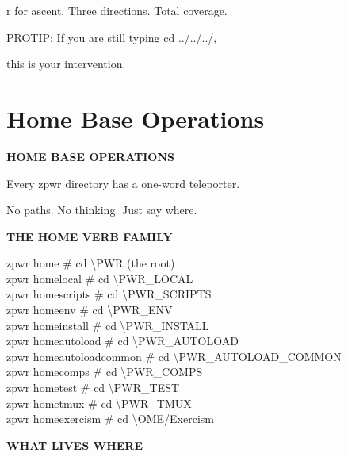 \documentclass[11pt,a4paper,twoside]{book}
\begin{document}
r for ascent. Three directions. Total coverage.

PROTIP: If you are still typing cd ../../../,

this is your intervention.


\vspace{16pt}

\section{Home Base Operations}


\vspace{10pt}
{\large\bfseries\color{neoncyan} HOME BASE OPERATIONS}\vspace{6pt}

\begin{codebox}
Every zpwr directory has a one-word teleporter.\\
\end{codebox}

No paths. No thinking. Just say where.


\vspace{12pt}
{\bfseries\color{neonyellow} THE HOME VERB FAMILY}\vspace{4pt}

\begin{codebox}
zpwr home                \# cd \textbackslash{}PWR (the root)\\
zpwr homelocal           \# cd \textbackslash{}PWR\_LOCAL\\
zpwr homescripts         \# cd \textbackslash{}PWR\_SCRIPTS\\
zpwr homeenv             \# cd \textbackslash{}PWR\_ENV\\
zpwr homeinstall         \# cd \textbackslash{}PWR\_INSTALL\\
zpwr homeautoload        \# cd \textbackslash{}PWR\_AUTOLOAD\\
zpwr homeautoloadcommon   \# cd \textbackslash{}PWR\_AUTOLOAD\_COMMON\\
zpwr homecomps           \# cd \textbackslash{}PWR\_COMPS\\
zpwr hometest            \# cd \textbackslash{}PWR\_TEST\\
zpwr hometmux            \# cd \textbackslash{}PWR\_TMUX\\
zpwr homeexercism        \# cd \textbackslash{}OME/Exercism\\
\end{codebox}


\vspace{12pt}
{\bfseries\color{neonyellow} WHAT LIVES WHERE}\vspace{4pt}
\end{document}
